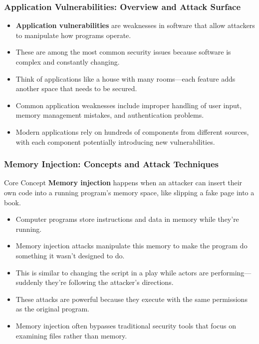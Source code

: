 \documentclass{beamer}
\begin{document}
\begin{frame}
    \frametitle{Application Vulnerabilities: Overview and Attack Surface}
    
    \begin{itemize}
        \item \textbf{Application vulnerabilities} are weaknesses in software that allow attackers to manipulate how programs operate.
        \item These are among the most common security issues because software is complex and constantly changing.
        \item Think of applications like a house with many rooms—each feature adds another space that needs to be secured.
        \item Common application weaknesses include improper handling of user input, memory management mistakes, and authentication problems.
        \item Modern applications rely on hundreds of components from different sources, with each component potentially introducing new vulnerabilities.
    \end{itemize}
\end{frame}

\begin{frame}
    \frametitle{Memory Injection: Concepts and Attack Techniques}
    
    \begin{block}{Core Concept}
        \textbf{Memory injection} happens when an attacker can insert their own code into a running program's memory space, like slipping a fake page into a book.
    \end{block}
    
    \begin{itemize}
        \item Computer programs store instructions and data in memory while they're running.
        \item Memory injection attacks manipulate this memory to make the program do something it wasn't designed to do.
        \item This is similar to changing the script in a play while actors are performing—suddenly they're following the attacker's directions.
        \item These attacks are powerful because they execute with the same permissions as the original program.
        \item Memory injection often bypasses traditional security tools that focus on examining files rather than memory.
    \end{itemize}
\end{frame}
\end{document}
